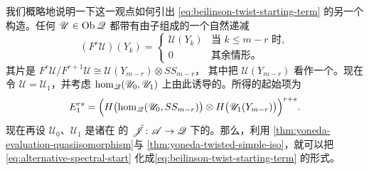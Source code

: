 \begin{remark}\label{thm:alternative-spectral-sequence}
我们概略地说明一下这一观点如何引出\trSpectralSequence{}
\eqref{eq:beilinson-twist-starting-term} 的另一个构造。任何
$\mathscr{U}\in\operatorname{Ob}\mathscr{Q}$ 都带有由子\trModule{}组成的一个自然递减%
\trFiltration
\begin{equation*}
(F^r\mathscr{U})(Y_k)=
\begin{cases}
\mathscr{U}(Y_k) & \text{当 } k\le m-r \text{ 时},\\
0 & \text{其余情形。}
\end{cases}
\end{equation*}
其\trGraded{}片是
$F^r\mathscr{U}/F^{r+1}\mathscr{U}\cong\mathscr{U}(Y_{m-r})\otimes SS_{m-r}$，
其中把 $\mathscr{U}(Y_{m-r})$ 看作一个\trVectorSpace\trChainComplex。现在令
$\mathscr{U}=\mathscr{U}_1$，并考虑 $\hom_{\mathscr{Q}}(\mathscr{U}_0,\mathscr{U}_1)$
上由此诱导的\trFiltration。所得\trSpectralSequence{}的起始项为
\begin{equation}\label{eq:alternative-spectral-start}
E_1^{rs}=\Bigl(H\bigl(\hom_{\mathscr{Q}}(\mathscr{U}_0,SS_{m-r})\bigr)\otimes
H\bigl(\mathscr{U}_1(Y_{m-r})\bigr)\Bigr)^{r+s}.
\end{equation}
现在再设 $\mathscr{U}_0$、$\mathscr{U}_1$ 是诸\trTwistedComplex{}在%
\trCohomology\trFullyFaithful{}的\trEmbedding{}%
$\tilde{\mathscr{J}}\colon\mathscr{A}\to\mathscr{Q}$ 下的\trImage。那么，利用 %
\cref{thm:yoneda-evaluation-quasiisomorphism}与%
\cref{thm:yoneda-twisted-simple-iso}，就可以把\eqref{eq:alternative-spectral-start}
化成\eqref{eq:beilinson-twist-starting-term} 的形式。
\end{remark}
